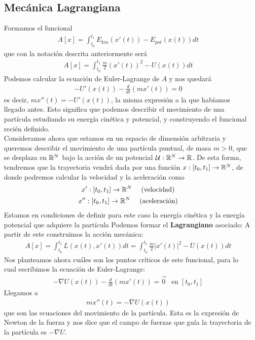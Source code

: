 \subsection{Mecánica Lagrangiana}
Formamos el funcional
\begin{gather*}
    A[x] = \int_{t_0}^{t_1} E_{kin}(x'(t)) - E_{pot}(x(t)) dt
\end{gather*}
que con la notación descrita anteriormente será
\begin{gather*}
    A[x] = \int_{t_0}^{t_1} \frac{m}{2} (x'(t))^2 - U(x(t)) dt
\end{gather*}
Podemos calcular la ecuación de Euler-Lagrange de $A$ y nos quedará
\begin{gather*}
    -U'(x(t)) - \frac{d}{dt} (mx'(t)) = 0
\end{gather*}
es decir, $mx''(t) = -U'(x(t))$, la misma expresión a la que habíamos llegado antes. Esto significa que podemos describir el movimiento de una partícula estudiando su energía cinética y potencial, y construyendo el funcional recién definido.\\

Consideramos ahora que estamos en un espacio de dimensión arbitraria y queremos describir el movimiento de una partícula puntual, de masa $m>0$, que se desplaza en $\mathbb{R}^N$ bajo la acción de un potencial $\mathcal{U}:\mathbb{R}^N \to \mathbb{R}$. De esta forma, tendremos que la trayectoria vendrá dada por una función $x:[t_0,t_1] \to \mathbb{R}^N$, de donde podremos calcular la velocidad y la aceleración como 
\begin{gather*}
    x':[t_0,t_1] \to \mathbb{R}^N \ \ \ \ \text{(velocidad)}\\
    x'':[t_0,t_1] \to \mathbb{R}^N \ \ \ \ \text{(aceleración)}
\end{gather*}
Estamos en condiciones de definir para este caso la energía cinética y la energía potencial que adquiere la partícula
Podemos formar el \textbf{Lagrangiano} asociado:
A partir de este construimos la acción mecánica:
\begin{gather*}
    A[x] = \int_{t_0}^{t_1} L(x(t), x'(t)) dt = \int_{t_0}^{t_1} \frac{m}{2} |x'(t)|^2 - U(x(t)) dt
\end{gather*}
Nos planteamos ahora cuáles son los puntos críticos de este funcional, para lo cual escribimos la ecuación de Euler-Lagrange:
\begin{gather*}
    -\nabla U(x(t)) -\frac{d}{dt} (mx'(t)) = \vec{0} \ \ \text{ en } [t_0, t_1]
\end{gather*}
Llegamos a 
\begin{gather*}
    mx''(t) = -\nabla U(x(t))
\end{gather*}
que son las ecuaciones del movimiento de la partícula. Esta es la expresión de Newton de la fuerza y nos dice que el campo de fuerzas que guía la trayectoria de la partícula es $-\nabla U$.

